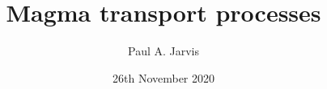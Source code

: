\documentclass{beamer}
\title[Modeling volcanic processes]{Magma transport processes} %
\author[Paul Jarvis]{Paul A. Jarvis} %
\institute[UNIGE] %
{
\textit{paul.jarvis@unige.ch} %
}
\date{26th November 2020} %
\begin{document}
\begin{frame}
\titlepage %
\end{frame}





\end{document}

